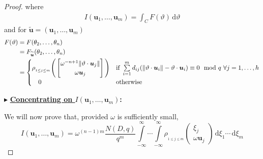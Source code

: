 \documentclass[11pt]{article}
\theoremstyle{definition}
\theoremstyle{proof}
\begin{document}
\begin{proof}
    where
    \begin{align}\label{IeqiF}
        I(\bm{u}_1, \ldots, \bm{u}_m) = \int_{C} F(\vartheta ) \, \mathrm{d} \vartheta 
    \end{align}
    and for $\widetilde{\bm{u}} = (\bm{u}_1, \ldots, \bm{u}_m)$
    \begin{align*}
        F(\vartheta ) &= F(\theta _2, \ldots, \theta _n) \\
        &= F_{\widetilde{\bm{u}}}(\theta _2, \ldots, \theta _n) \\
        &=
        \begin{cases}
            \rho _{_{1\leq j\leq m}} \Bigg(
            \begin{bmatrix}
                \omega ^{-n+1}\norm{\vartheta \cdot \bm{u}_j} \\
                \omega \bm{u}_j
            \end{bmatrix}
            \Bigg)   & \text{if} \ \sum\limits_{i=1}^{m}d_{ij}(\norm{\vartheta \cdot \bm{u}_i}- \vartheta \cdot \bm{u}_i) \equiv 0 \mod q \ \forall j = 1, \ldots, h \\
            \ \ \ 0  & \text{otherwise} 
        \end{cases}
    \end{align*}

    $\blacktriangleright$ \textbf{\uline{Concentrating on $I(\bm{u}_1, \ldots, \bm{u}_m)$}:}

    We will now prove that, provided $\omega$ is sufficiently small,
    \[
        I(\bm{u}_1, \ldots, \bm{u}_m) = \omega ^{(n-1)m} \frac{N(D, q)}{q^m} \int\limits_{-\infty}^{\infty} \cdots \int\limits_{-\infty}^{\infty} \rho _{_{1 \leq j \leq m}}
        \begin{pmatrix}
            \xi _j \\
            \omega \bm{u}_j
        \end{pmatrix}
        \, \mathrm{d} \xi _1 \cdots \, \mathrm{d} \xi _m
    \]


\end{proof}
\end{document}
